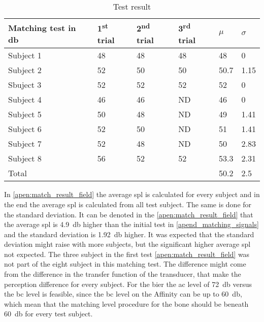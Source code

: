 \begin{table}[H]
\centering
\caption{Test result}
\begin{tabular}{l|lll|ll}
Matching test in \si{\decibel}   & 1\textsuperscript{st} trial & 2\textsuperscript{nd} trial & 3\textsuperscript{rd} trial & $\mu$ & $\sigma$ \\ \hline
Subject 1  & 48          & 48           & 48          & 48          & 0                  \\
Subject 2  & 52          & 50           & 50          & 50.7        & 1.15               \\
Sbuject 3  & 52          & 52           & 52          & 52          & 0                  \\
Subject 4  & 46          & 46           & ND          & 46          & 0                  \\
Subject 5  & 50          & 48           & ND          & 49          & 1.41               \\
Subject 6  & 52          & 50           & ND          & 51          & 1.41               \\
Subject 7  & 52          & 48           & ND          & 50          & 2.83               \\
Subject 8  & 56          & 52           & 52          & 53.3        & 2.31               \\ \hline
Total      &             &              &             & 50.2        & 2.5               
\end{tabular}
\label{apen:match_result_field}
\end{table}

In \autoref{apen:match_result_field} the average \gls{spl} is calculated for every subject and in the end the average \gls{spl} is calculated from all test subject. The same is done for the standard deviation. It can be denoted in the  \autoref{apen:match_result_field} that the average \gls{spl} is \SI{4.9}{\decibel} higher than the initial test in \autoref{apend_matching_signals} and the standard deviation is \SI{1.92}{\decibel} higher. It was expected that the standard deviation might raise with more subjects, but the significant higher average \gls{spl} not expected. The three subject in the first test     \autoref{apen:match_result_field} was not part of the eight subject in this matching test. The difference might come from the difference in the transfer function of the transducer, that make the perception difference for every subject. For the \gls{bier} the \gls{ac} level of \SI{72}{\decibel} versus the  \gls{bc} level is feasible, since the \gls{bc} level on the Affinity can be up to \SI{60}{\decibel}, which mean that the matching level procedure for the bone should be beneath \SI{60}{\decibel} for every test subject.


